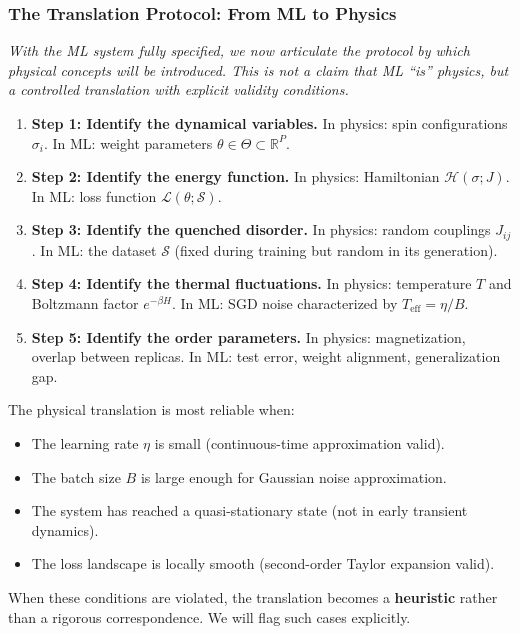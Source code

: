 \documentclass[
  journal=largetwo,
  year=2025,
  volume=37,
]{cup-journal}
\begin{document}
\subsubsection{The Translation Protocol: From ML to Physics}

\textit{With the ML system fully specified, we now articulate the protocol by which physical concepts will be introduced. This is not a claim that ML ``is'' physics, but a controlled translation with explicit validity conditions.}

\begin{enumerate}
    \item \textbf{Step 1: Identify the dynamical variables.} In physics: spin configurations $\sigma_i$. In ML: weight parameters $\theta \in \Theta \subset \mathbb{R}^P$.
    
    \item \textbf{Step 2: Identify the energy function.} In physics: Hamiltonian $\mathcal{H}(\sigma; J)$. In ML: loss function $\mathcal{L}(\theta; \mathcal{S})$.
    
    \item \textbf{Step 3: Identify the quenched disorder.} In physics: random couplings $J_{ij}$. In ML: the dataset $\mathcal{S}$ (fixed during training but random in its generation).
    
    \item \textbf{Step 4: Identify the thermal fluctuations.} In physics: temperature $T$ and Boltzmann factor $e^{-\beta H}$. In ML: SGD noise characterized by $T_{\text{eff}} = \eta/B$.
    
    \item \textbf{Step 5: Identify the order parameters.} In physics: magnetization, overlap between replicas. In ML: test error, weight alignment, generalization gap.
\end{enumerate}

\begin{remark}
The physical translation is most reliable when:
\begin{itemize}
    \item The learning rate $\eta$ is small (continuous-time approximation valid).
    \item The batch size $B$ is large enough for Gaussian noise approximation.
    \item The system has reached a quasi-stationary state (not in early transient dynamics).
    \item The loss landscape is locally smooth (second-order Taylor expansion valid).
\end{itemize}
When these conditions are violated, the translation becomes a \textbf{heuristic} rather than a rigorous correspondence. We will flag such cases explicitly.
\end{remark}
\end{document}
